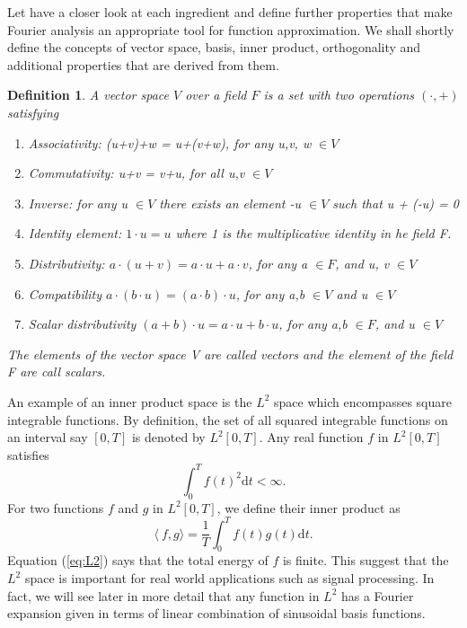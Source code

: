 \documentclass[11pt, oneside]{article}   	%
\newtheorem{definition}{Definition}
\begin{document}
\justify
Let have a closer look at each ingredient and define further properties that make Fourier analysis an appropriate tool for function approximation. We shall shortly define the concepts of vector space, basis, inner product, orthogonality and additional properties that are derived from them.
\begin{definition}
A vector space $V$ over a field $F$ is a set  with two operations $(\cdot, +)$ satisfying 
\begin{enumerate}
\item Associativity:  (u+v)+w = u+(v+w), for any u,v, w $\in V$
\item Commutativity: u+v = v+u, for all u,v $\in V$
\item Inverse: for any u $\in V$ there exists an element -u $\in V$ such that u + (-u) = 0
\item Identity element: $1\cdot u = u$ where 1 is the multiplicative identity in he field F.
\item Distributivity: $a\cdot(u+v) = a\cdot u + a\cdot v$, for any a $\in F$, and u, v $\in V$
\item Compatibility $a\cdot(b\cdot u) = (a\cdot b)\cdot u$, for any a,b $\in V$ and u $\in V$
\item Scalar distributivity $(a+b)\cdot u = a\cdot u + b\cdot u$, for any a,b $\in F$, and u $\in V$
\end{enumerate}
The elements of the vector space V are called vectors and the element of the field F are call scalars.
\end{definition}
An example of an inner product space is the $L^{2}$ space which encompasses square integrable functions. By definition, the set of all squared integrable functions on an interval say $[0,T]$ is denoted by 
$L^{2}[0,T]$. Any real function $f$ in $L^{2}[0,T]$ satisfies
\begin{equation} \label{eq:L2}
\int_{0}^{T}f(t)^{2}\mathrm{d}t < \infty.
\end{equation}
For two functions $f$ and $g$ in $L^{2}[0,T]$, we define their inner product as 
\begin{equation}
\langle\ f,g \rangle = \frac{1}{T}\int_{0}^{T}f(t)g(t)\mathrm{d}t.
\end{equation}
Equation (\ref{eq:L2}) says that the total energy of $f$ is finite. This suggest that the $L^{2}$ space is important for real world applications such as signal processing. In fact, we will see  later in more detail that any function in $L^{2}$ has a Fourier expansion given in terms of linear combination of sinusoidal basis functions. 
\end{document}
